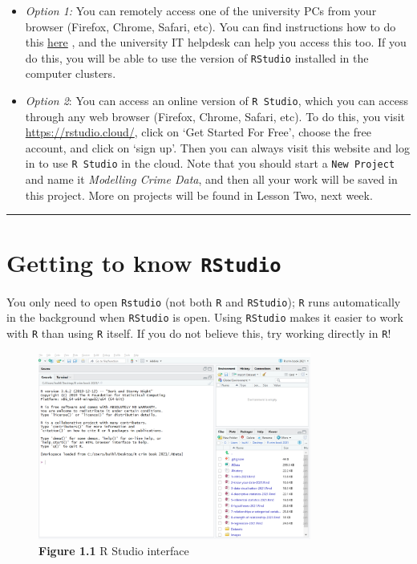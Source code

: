 \documentclass[
]{book}
\begin{document}
\begin{itemize}
\item
  \emph{Option 1:} You can remotely access one of the university PCs from your browser (Firefox, Chrome, Safari, etc). You can find instructions how to do this \href{https://www.itservices.manchester.ac.uk/students/pc-on-campus/remote-cluster-access/}{here} , and the university IT helpdesk can help you access this too. If you do this, you will be able to use the version of \texttt{RStudio} installed in the computer clusters.
\item
  \emph{Option 2}: You can access an online version of \texttt{R\ Studio}, which you can access through any web browser (Firefox, Chrome, Safari, etc). To do this, you visit \url{https://rstudio.cloud/}, click on `Get Started For Free', choose the free account, and click on `sign up'. Then you can always visit this website and log in to use \texttt{R\ Studio} in the cloud. Note that you should start a \texttt{New\ Project} and name it \emph{Modelling Crime Data}, and then all your work will be saved in this project. More on projects will be found in Lesson Two, next week.
\end{itemize}

\begin{center}\rule{0.5\linewidth}{0.5pt}\end{center}

\hypertarget{getting-to-know-rstudio}{%
\section{\texorpdfstring{Getting to know \texttt{RStudio}}{Getting to know RStudio}}\label{getting-to-know-rstudio}}

You only need to open \texttt{Rstudio} (not both \texttt{R} and \texttt{RStudio}); \texttt{R} runs automatically in the background when \texttt{RStudio} is open. Using \texttt{RStudio} makes it easier to work with \texttt{R} than using \texttt{R} itself. If you do not believe this, try working directly in \texttt{R}!

\begin{figure}
\centering
\includegraphics[width=0.8\textwidth,height=\textheight]{Images/rstudio1.png}
\caption{\textbf{Figure 1.1} R Studio interface}
\end{figure}
\end{document}
